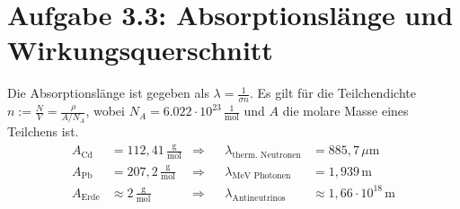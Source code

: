 \documentclass[a4paper,12pt]{article}
\newcommand{\tecxt}{}
\begin{document}
\section*{Aufgabe 3.3: Absorptionslänge und Wirkungsquerschnitt}
Die Absorptionslänge ist gegeben als $\lambda=\frac{1}{\sigma n}$. Es gilt für die Teilchendichte $n:=\frac{N}{V}=\frac{\rho}{A/N_A}$, wobei $N_A=6.022\cdot 10^{23}\,\frac{1}{\tecxt\text{mol}}$ und $A$ die molare Masse eines Teilchens ist. 
\begin{align*}
A_\tecxt\text{Cd}&=112,41\,\frac{\tecxt\text{g}}{\tecxt\text{mol}}&\Rightarrow&&\lambda_\tecxt\text{therm. Neutronen}&=885,7\,\mu\tecxt\text{m}\\
A_\tecxt\text{Pb}&=207,2\,\frac{\tecxt\text{g}}{\tecxt\text{mol}}&\Rightarrow&&\lambda_\tecxt\text{MeV Photonen}&=1,939\,\tecxt\text{m}\\
A_\tecxt\text{Erde}&\approx 2\,\frac{\tecxt\text{g}}{\tecxt\text{mol}}&\Rightarrow&&\lambda_\tecxt\text{Antineutrinos}&\approx 1,66\cdot 10^{18}\,\tecxt\text{m}
\end{align*}
\end{document}
